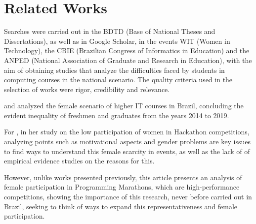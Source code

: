 \section{Related Works}
\label{sec:firstpage}

Searches were carried out in the BDTD (Base of National Theses and Dissertations), as well as in Google Scholar, in the events WIT (Women in Technology), the CBIE (Brazilian Congress of Informatics in Education) and the ANPED (National Association of Graduate and Research in Education), with the aim of obtaining studies that analyze the difficulties faced by students in computing courses in the national scenario. The quality criteria used in the selection of works were rigor, credibility and relevance.

\cite{Santos:21} and \cite{maia_2016} analyzed the female scenario of higher IT courses in Brazil, concluding the evident inequality of freshmen and graduates from the years 2014 to 2019.

For \cite{Paganini:20}, in her study on the low participation of women in Hackathon competitions, analyzing points such as motivational aspects and gender problems are key issues to find ways to understand this female scarcity in events, as well as the lack of of empirical evidence studies on the reasons for this.

However, unlike works presented previously, this article presents an analysis of female participation in Programming Marathons, which are high-performance competitions, showing the importance of this research, never before carried out in Brazil, seeking to think of ways to expand this representativeness and female participation.